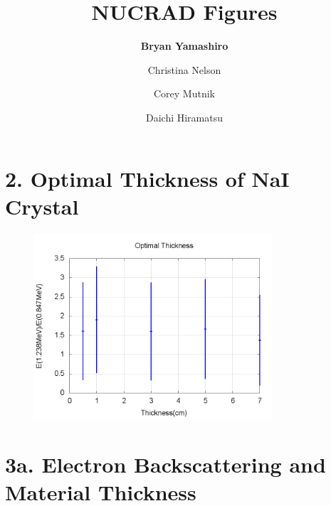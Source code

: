 \documentclass[aps,prl,twocolumn,superscriptaddress]{revtex4-1}
\begin{document}





\title{NUCRAD Figures}


\author{\textbf{Bryan Yamashiro}}
\author{Christina Nelson}
\author{Corey Mutnik}
\author{Daichi Hiramatsu}

\maketitle




\section{2. Optimal Thickness of NaI Crystal}

\begin{figure}[h!]
  \begin{center}
\centerline{\includegraphics[width=3.5in]{thick.png}}
  \end{center}
\end{figure}

\section{3a. Electron Backscattering and Material Thickness}
\end{document}
